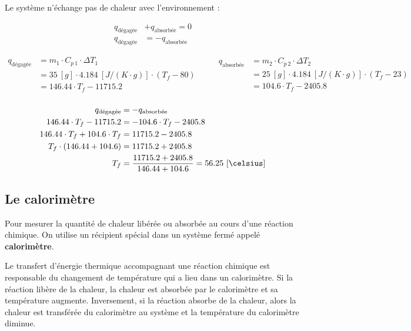 \documentclass[
  11pt,
  a4paper,
  openany]{book}
\begin{document}
\begin{Answer}
Le système n'échange pas de chaleur avec l'environnement :

\[
\begin{split}
q_{\text{dégagée}} &+ q_{\text{absorbée}} = 0 \\
q_{\text{dégagée}} &= - q_{\text{absorbée}}
\end{split}
\]

\[
\begin{split}
q_{\text{dégagée}} &= m_1 \cdot C_{p\ 1} \cdot \Delta T_1 \\
  &= 35\ [g] \cdot 4.184\ [J/(K \cdot g)] \cdot (T_f - 80) \\
  &= 146.44 \cdot T_f - 11715.2 \\
\end{split}
\qquad
\begin{split}
q_{\text{absorbée}} &= m_2 \cdot C_{p\ 2} \cdot \Delta T_2 \\
  &= 25\ [g] \cdot 4.184\ [J/(K \cdot g)] \cdot (T_f - 23) \\
  &= 104.6 \cdot T_f - 2405.8 \\
\end{split}
\]

\[
\begin{split}
q_{\text{dégagée}} &= - q_{\text{absorbée}} \\
146.44 \cdot T_f - 11715.2 &= - 104.6 \cdot T_f - 2405.8 \\
146.44 \cdot T_f + 104.6 \cdot T_f &= 11715.2 - 2405.8 \\
T_f \cdot (146.44 + 104.6) &= 11715.2 + 2405.8 \\
T_f &= \frac{11715.2 + 2405.8}{146.44+104.6} = 56.25\ [\celsius]
\end{split}
\]

\end{Answer}

\subsection{Le calorimètre}\label{le-calorimuxe8tre}

Pour mesurer la quantité de chaleur libérée ou absorbée au cours d'une réaction chimique. On utilise un récipient spécial dans un système fermé appelé \textbf{calorimètre}.

Le transfert d'énergie thermique accompagnant une réaction chimique est responsable du changement de température qui a lieu dans un calorimètre. Si la réaction libère de la chaleur, la chaleur est absorbée par le calorimètre et sa température augmente. Inversement, si la réaction absorbe de la chaleur, alors la chaleur est transférée du calorimètre au système et la température du calorimètre diminue.
\end{document}
